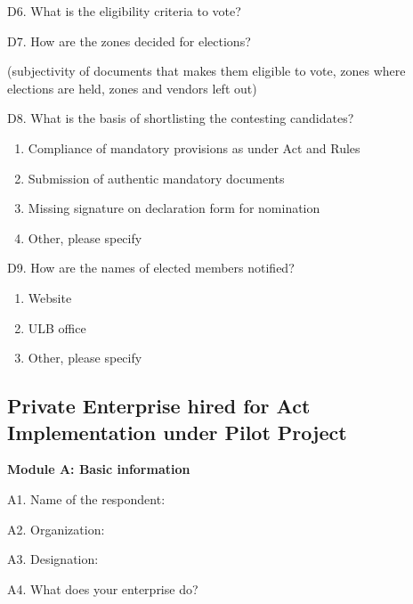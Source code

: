\documentclass[a4paper, 12pt, twoside]{article}
\begin{document}
{{\begin{mdframed}[backgroundcolor=gray!20]

D6. What is the eligibility criteria to vote?

D7. How are the zones decided for elections?

       (subjectivity of documents that makes them eligible to vote, zones where elections are held,
       zones and vendors left out)

D8. What is the basis of shortlisting the contesting candidates?
\begin{enumerate}[nosep]
\item Compliance of mandatory provisions as under Act and Rules
\item Submission of authentic mandatory documents
\item Missing signature on declaration form for nomination
\item Other, please specify
\end{enumerate}

D9. How are the names of elected members notified?
\begin{enumerate}[nosep]
\item Website
\item ULB office
\item Other, please specify
\end{enumerate}
\end{mdframed}

\begin{mdframed}[backgroundcolor=gray!20]
\subsection*{Private Enterprise hired for Act Implementation under Pilot Project}

\textbf{Module A: Basic information}

A1. Name of the respondent:

A2. Organization:

A3. Designation:

A4. What does your enterprise do?


\end{mdframed}}}
\end{document}

